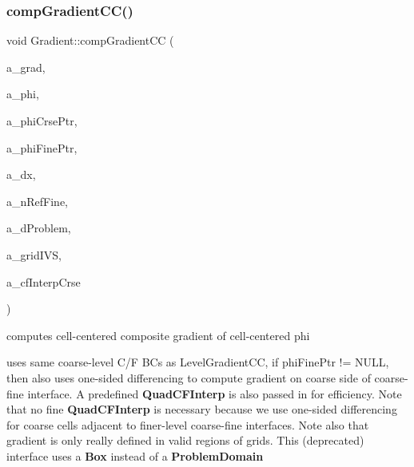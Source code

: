 \subsubsection{\texorpdfstring{comp\+Gradient\+C\+C()}{compGradientCC()}\hspace{0.1cm}{\footnotesize\ttfamily [4/6]}}
{\footnotesize\ttfamily void Gradient\+::comp\+Gradient\+CC (\begin{DoxyParamCaption}\item[{\textbf{ Level\+Data}$<$ \textbf{ F\+Array\+Box} $>$ \&}]{a\+\_\+grad,  }\item[{\textbf{ Level\+Data}$<$ \textbf{ F\+Array\+Box} $>$ \&}]{a\+\_\+phi,  }\item[{const \textbf{ Level\+Data}$<$ \textbf{ F\+Array\+Box} $>$ $\ast$}]{a\+\_\+phi\+Crse\+Ptr,  }\item[{const \textbf{ Level\+Data}$<$ \textbf{ F\+Array\+Box} $>$ $\ast$}]{a\+\_\+phi\+Fine\+Ptr,  }\item[{const \textbf{ Real}}]{a\+\_\+dx,  }\item[{const int}]{a\+\_\+n\+Ref\+Fine,  }\item[{const \textbf{ Box} \&}]{a\+\_\+d\+Problem,  }\item[{const \textbf{ Layout\+Data}$<$ \textbf{ Int\+Vect\+Set} $>$ \&}]{a\+\_\+grid\+I\+VS,  }\item[{\textbf{ Quad\+C\+F\+Interp} \&}]{a\+\_\+cf\+Interp\+Crse }\end{DoxyParamCaption})\hspace{0.3cm}{\ttfamily [static]}}



computes cell-\/centered composite gradient of cell-\/centered phi 

uses same coarse-\/level C/F BC\textquotesingle{}s as Level\+Gradient\+CC, if phi\+Fine\+Ptr != N\+U\+LL, then also uses one-\/sided differencing to compute gradient on coarse side of coarse-\/fine interface. A predefined \textbf{ Quad\+C\+F\+Interp} is also passed in for efficiency. Note that no fine \textbf{ Quad\+C\+F\+Interp} is necessary because we use one-\/sided differencing for coarse cells adjacent to finer-\/level coarse-\/fine interfaces. Note also that gradient is only really defined in valid regions of grids. This (deprecated) interface uses a \textbf{ Box} instead of a \textbf{ Problem\+Domain} \mbox{\label{class_gradient_a23967a97f57bc4c1609e63faa2eaf437}} 
